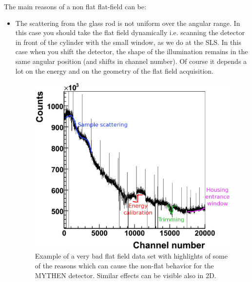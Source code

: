 The main reasons of a non flat flat-field can be:
\begin{itemize}
\item The scattering from the glass rod is not uniform over the angular range. In this case you should take the flat field dynamically i.e. scanning the detector in front of the cylinder with the small window, as we do at the SLS. In this case when you shift the detector, the shape of the illumination remains in the same angular position (and shifts in channel number). Of course it depends a lot on the energy and on the geometry of the flat field acquisition.
\begin{figure}
\begin{center}
\includegraphics[width=\textwidth]{images/bad_ff_col}
\end{center}
\caption{Example of a very bad flat field data set with highlights of some of the reasons which can cause the non-flat behavior for the MYTHEN detector. Similar effects can be visible also in 2D.}\label{fig:badff}
\end{figure}


\end{itemize}
